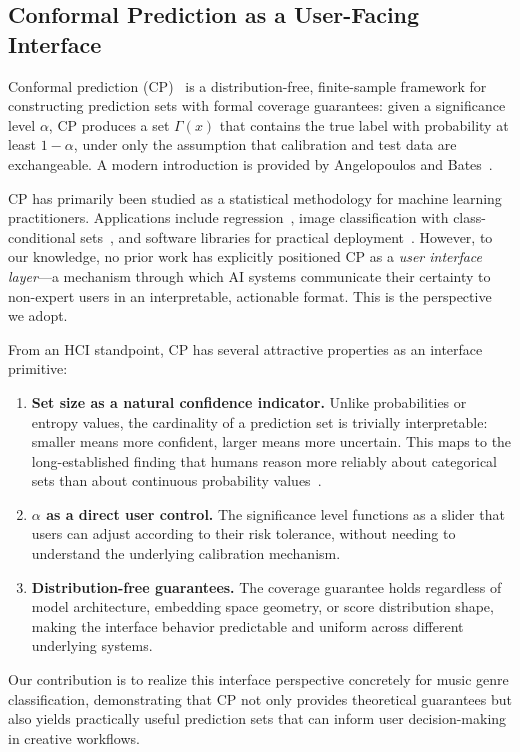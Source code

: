 \subsection{Conformal Prediction as a User-Facing Interface}

Conformal prediction (CP)~\cite{vovk2005algorithmic,shafer2008tutorial} is a
distribution-free, finite-sample framework for constructing prediction sets with
formal coverage guarantees: given a significance level $\alpha$, CP produces a
set $\Gamma(x)$ that contains the true label with probability at least
$1-\alpha$, under only the assumption that calibration and test data are
exchangeable. A modern introduction is provided by Angelopoulos and
Bates~\cite{angelopoulos2023gentle}.

CP has primarily been studied as a statistical methodology for machine learning
practitioners. Applications include regression~\cite{romano2019conformalized},
image classification with class-conditional
sets~\cite{angelopoulos2021uncertainty}, and software libraries for practical
deployment~\cite{cordier2023mapie}. However, to our knowledge, no prior work has
explicitly positioned CP as a \emph{user interface layer}---a mechanism through
which AI systems communicate their certainty to non-expert users in an
interpretable, actionable format. This is the perspective we adopt.

From an HCI standpoint, CP has several attractive properties as an interface
primitive:
\begin{enumerate}[leftmargin=*,itemsep=0pt]
    \item \textbf{Set size as a natural confidence indicator.} Unlike
    probabilities or entropy values, the cardinality of a prediction set is
    trivially interpretable: smaller means more confident, larger means more
    uncertain. This maps to the long-established finding that humans reason more
    reliably about categorical sets than about continuous probability
    values~\cite{miller2019explanation}.
    \item \textbf{$\alpha$ as a direct user control.} The significance level
    functions as a slider that users can adjust according to their risk
    tolerance, without needing to understand the underlying calibration
    mechanism.
    \item \textbf{Distribution-free guarantees.} The coverage guarantee holds
    regardless of model architecture, embedding space geometry, or score
    distribution shape, making the interface behavior predictable and uniform
    across different underlying systems.
\end{enumerate}

Our contribution is to realize this interface perspective concretely for music
genre classification, demonstrating that CP not only provides theoretical
guarantees but also yields practically useful prediction sets that can inform
user decision-making in creative workflows.
